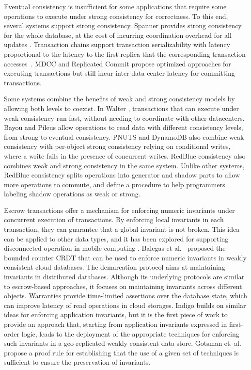 \documentclass[11pt]{article}
\begin{document}
Eventual consistency is insufficient for some applications that require
some operations to execute under strong consistency for correctness.
To this end, several systems support strong consistency.
Spanner provides strong consistency for the whole database, at the cost
of incurring coordination overhead for all updates  \cite{spanner}.
Transaction chains support transaction serializability with latency
proportional to the latency to the first replica that the corresponding transaction accesses~\cite{transactionchains}.
MDCC \cite{mdcc} and Replicated Commit \cite{replicatedcommit} propose optimized approaches for executing transactions but still incur inter-data center latency for committing transactions.

Some systems combine the benefits of weak and strong consistency models by allowing both levels to coexist.
In Walter \cite{walter}, transactions that can execute under weak consistency run fast, without needing to coordinate with other datacenters.
Bayou \cite{bayou} and Pileus \cite{Pileus} allow operations to read data with different consistency levels, from strong to eventual consistency.
PNUTS \cite{pnuts} and DynamoDB \cite{dynamoDB} also combine weak consistency with per-object strong consistency relying on conditional writes, where a write fails in the presence of concurrent writes.
RedBlue consistency also combines weak and strong consistency in the same system.
Unlike other systems, RedBlue consistency splits operations into
generator and shadow parts to allow more
operations to commute, and define a procedure to help programmers labeling shadow operations
as weak or strong.

Escrow transactions \cite{ONeil1986Escrow} offer a mechanism for
enforcing numeric invariants under concurrent execution of transactions.
By enforcing local invariants in each transaction, they can guarantee that a
global invariant is not broken.
This  idea can be applied to other data types, and it has been
explored for supporting disconnected operation
in mobile computing \cite{Walborn95Semantics,mobisnap,exo-leasing}.
Balegas et al.~\cite{Balegas2015Counter} proposed the bounded counter CRDT
that can be used to enforce numeric invariants in weakly consistent cloud
databases.
The demarcation protocol \cite{BarbaraMilla1994Demarcation} aims at maintaining invariants
in distributed databases.
Although its underlying protocols are similar to escrow-based
approaches, it focuses on maintaining invariants across different objects.
Warranties \cite{warranties} provide time-limited assertions over the database state, which can improve latency of read operations in cloud storages.
Indigo builds on similar ideas for enforcing application invariants,
but it is the first piece of work
to provide an approach that, starting from application invariants expressed in first-order
logic, leads to the deployment of the appropriate techniques for enforcing such
invariants in a geo-replicated weakly consistent data store.
Gotsman et. al. \cite{GotsmanConsistencyReason} propose a proof rule
for establishing that the use of a given set of techniques is
sufficient to ensure the preservation of invariants.
\end{document}
